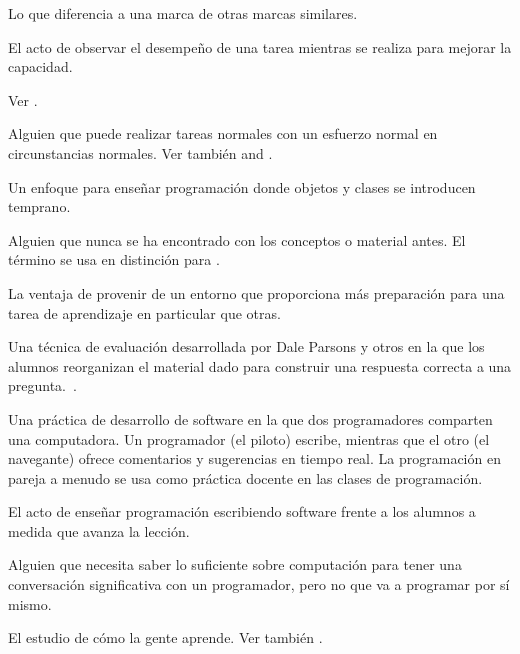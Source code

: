 \begin{description}
 Lo que diferencia a una marca de otras
marcas similares.

 El acto de observar el desempeño
de una tarea mientras se realiza para mejorar la capacidad.

Ver .

 Alguien que puede
realizar tareas normales con un esfuerzo normal en circunstancias normales. Ver también
 and .

 Un enfoque para enseñar programación donde
objetos y clases se introducen temprano.

 Alguien que nunca se ha
encontrado con los conceptos o material antes. El término se usa en distinción para
.

 La ventaja de provenir de un entorno que proporciona más preparación para una tarea de aprendizaje en particular que otras.

 Una técnica de evaluación desarrollada
por Dale Parsons y otros en la que los alumnos reorganizan el material dado
para construir una respuesta correcta a una pregunta.~\cite{Pars2006}.

 Una práctica de desarrollo de software en la que dos programadores comparten una computadora. Un programador (el piloto) escribe, mientras que el otro (el navegante) ofrece comentarios y sugerencias en tiempo real. La programación en pareja a menudo se usa como práctica docente en las clases de programación.

 El acto de enseñar programación
escribiendo software frente a los alumnos a medida que avanza la lección.

 Alguien que necesita saber lo suficiente sobre computación para tener una conversación significativa con un programador, pero no que va a programar por sí mismo.

 El estudio de cómo
la gente aprende. Ver también .


\end{description}
